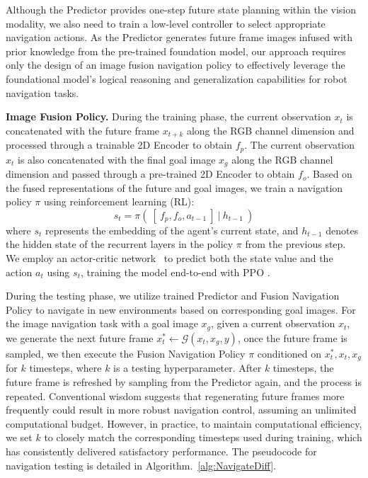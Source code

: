Although the Predictor provides one-step future state planning within the vision modality, we also need to train a low-level controller to select appropriate navigation actions. 
%
As the Predictor generates future frame images infused with prior knowledge from the pre-trained foundation model, our approach requires only the design of an image fusion navigation policy to effectively leverage the foundational model's logical reasoning and generalization capabilities for robot navigation tasks.

 \textbf{Image Fusion Policy.}
During the training phase, the current observation $x_t$ is concatenated with the future frame $x_{t+k}$ along the RGB channel dimension and processed through a trainable 2D Encoder to obtain $f_p$. The current observation $x_t$ is also concatenated with the final goal image $x_g$ along the RGB channel dimension and passed through a pre-trained 2D Encoder to obtain $f_o$. Based on the fused representations of the future and goal images, we train a navigation policy $\pi$ using reinforcement learning (RL):
\begin{equation}
s_t = \pi(~[~f_p, f_o, a_{t-1}~]~|~h_{t-1}~)
\end{equation}
where $s_t$ represents the embedding of the agent's current state, and $h_{t-1}$ denotes the hidden state of the recurrent layers in the policy $\pi$ from the previous step. We employ an actor-critic network~\cite{al2022zero} to predict both the state value and the action $a_t$ using $s_t$, training the model end-to-end with PPO \cite{schulman2017proximal}.

During the testing phase, we utilize trained Predictor and Fusion Navigation Policy to navigate in new environments based on corresponding goal images. For the image navigation task with a goal image $x_g$, given a current observation $x_t$, we generate the next future frame $x_t^* \leftarrow \mathcal{G}(x_t,x_g,y)$, once the future frame is sampled, we then execute the Fusion Navigation Policy $\pi$ conditioned on $x_t^*,x_t,x_g$ for $k$ timesteps, where $k$ is a testing hyperparameter. After $k$ timesteps, the future frame is refreshed by sampling from the Predictor again, and the process is repeated. Conventional wisdom suggests that regenerating future frames more frequently could result in more robust navigation control, assuming an unlimited computational budget. However, in practice, to maintain computational efficiency, we set $k$ to closely match the corresponding timesteps used during training, which has consistently delivered satisfactory performance. The pseudocode for navigation testing is detailed in Algorithm.~\ref{alg:NavigateDiff}.

